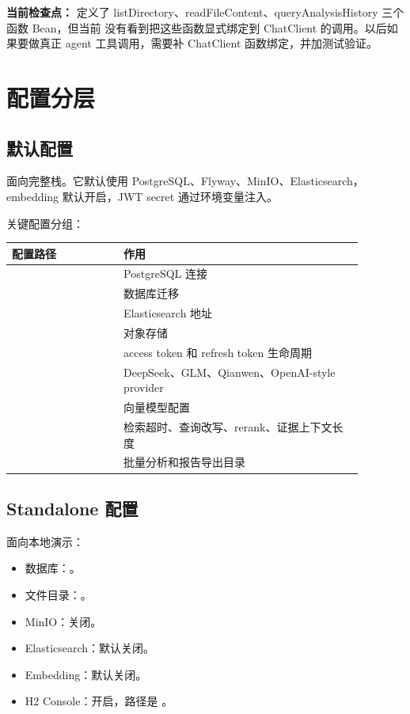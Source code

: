 \documentclass[UTF8,zihao=-4]{ctexart}
\newcommand{\risk}[1]{\textcolor{warn}{\textbf{#1}}}
\begin{document}
\risk{当前检查点：}  定义了 listDirectory、readFileContent、queryAnalysisHistory 三个函数 Bean，但当前  没有看到把这些函数显式绑定到 ChatClient 的调用。以后如果要做真正 agent 工具调用，需要补 ChatClient 函数绑定，并加测试验证。

\section{配置分层}

\subsection{默认配置}

 面向完整栈。它默认使用 PostgreSQL、Flyway、MinIO、Elasticsearch，embedding 默认开启，JWT secret 通过环境变量注入。

关键配置分组：

\begin{longtable}{L{0.28\linewidth}L{0.60\linewidth}}
\toprule
配置路径 & 作用 \\
\midrule
{} & PostgreSQL 连接 \\
 & 数据库迁移 \\
 & Elasticsearch 地址 \\
 & 对象存储 \\
 & access token 和 refresh token 生命周期 \\
 & DeepSeek、GLM、Qianwen、OpenAI-style provider \\
 & 向量模型配置 \\
 & 检索超时、查询改写、rerank、证据上下文长度 \\
 & 批量分析和报告导出目录 \\
\bottomrule
\end{longtable}

\subsection{Standalone 配置}

 面向本地演示：

\begin{itemize}
  \item 数据库：。
  \item 文件目录：。
  \item MinIO：关闭。
  \item Elasticsearch：默认关闭。
  \item Embedding：默认关闭。
  \item H2 Console：开启，路径是 。
\end{itemize}
\end{document}
